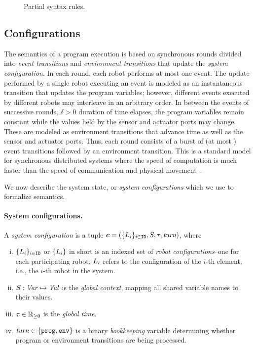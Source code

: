 \begin{figure}
\caption{\small Partial \lgname syntax rules.}\label{fig:partial-syntax}
\end{figure}


\subsection{Configurations}
\label{sec:configs}

The semantics of a \lgname program execution is based on synchronous rounds divided into \emph{event transitions} and \emph{environment transitions} that update the \emph{system configuration}.
In each round, each robot performs at most one event.
The update performed by a single robot executing an event is modeled as an instantaneous transition that updates the program variables;
however, different events executed by different robots may interleave in an arbitrary order.
In between the events of successive rounds, $\delta>0$ duration of time elapses, the program variables remain constant while the values held by the sensor and actuator ports may change.
These are modeled as environment transitions that advance time as well as the sensor and actuator ports.
%
Thus, each round consists of a burst of (at most \NMAX) event transitions followed by an environment transition. This is a standard model for synchronous distributed systems where the speed of computation is much faster than the speed of communication and physical movement~\cite{lynch1996a,attiyawelch}.

We now describe the system state, or \emph{system configurations} which we use to formalize \lgname semantics.

\paragraph{System configurations.}

A \emph{system configuration} is a tuple $\mathit{\boldsymbol{c}} = (\{L_{i}\}_{i\in\texttt{ID}},{S},\tau,\mathit{turn})$, where

\begin{enumerate}[(i)]
\item $\{L_{i}\}_{i\in\texttt{ID}}$ or $\{L_{i}\}$ in short is an indexed set of \emph{robot configurations}--one for each participating robot.
      $L_{i}$ refers to the configuration of the $i$-th element, i.e., the $i$-th robot in the system.
\item ${S} : \mathit{Var} \mapsto \mathit{Val}$ is the {\em global context\/}, mapping all shared variable names to their values.
\item $\tau\in \nnreals$ is the {\em global time\/}.
\item $\mathit{turn}\in\{\mathtt{prog},\mathtt{env}\}$ is a binary \emph{bookkeeping} variable determining whether program or environment transitions are being processed.
\end{enumerate}

